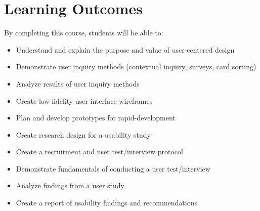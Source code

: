 \documentclass[12pt]{article}
\begin{document}
  \section*{Learning Outcomes}
  \noindent
  By completing this course, students will be able to:
  \begin{itemize}
    \item Understand and explain the purpose and value of user-centered design
    \item Demonstrate user inquiry methods (contextual inquiry, surveys, card sorting)
    \item Analyze results of user inquiry methods
    \item Create low-fidelity user interface wireframes
    \item Plan and develop prototypes for rapid-development
    \item Create research design for a usability study 
    \item Create a recruitment and user test/interview protocol
    \item Demonstrate fundamentals of conducting a user test/interview
    \item Analyze findings from a user study
    \item Create a report of usability findings and recommendations
  \end{itemize}
\end{document}
